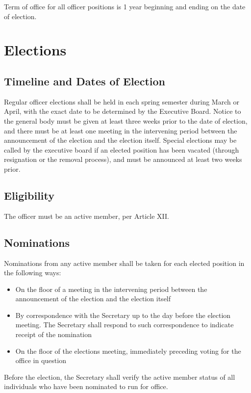 \documentclass{article}
\begin{document}
Term of office for all officer positions is 1 year beginning and ending on the date of election.

\section{Elections}
\subsection{Timeline and Dates of Election}
Regular officer elections shall be held in each spring semester during March or April, with the exact date to be determined by the Executive Board. Notice to the general body must be given at least three weeks prior to the date of election, and there must be at least one meeting in the intervening period between the announcement of the election and the election itself. Special elections may be called by the executive board if an elected position has been vacated (through resignation or the removal process), and must be announced at least two weeks prior.

\subsection{Eligibility}
The officer must be an active member, per Article XII.

\subsection{Nominations}
Nominations from any active member shall be taken for each elected position in the following ways:

\begin{itemize}
    \item On the floor of a meeting in the intervening period between the announcement of the election and the election itself
    \item By correspondence with the Secretary up to the day before the election meeting. The Secretary shall respond to such correspondence to indicate receipt of the nomination
    \item On the floor of the elections meeting, immediately preceding voting for the office in question
\end{itemize}

Before the election, the Secretary shall verify the active member status of all individuals who have been nominated to run for office.
\end{document}
